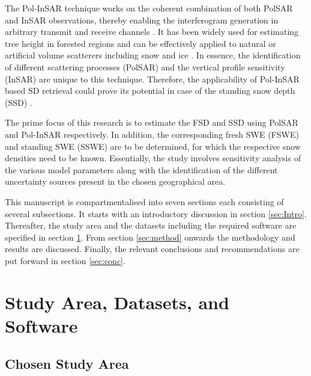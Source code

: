 \documentclass[review]{elsarticle}
\begin{document}
The Pol-InSAR technique works on the coherent combination of both PolSAR and InSAR observations, thereby enabling the interferogram generation in arbitrary transmit and receive channels \citep{Cloude1998, Cloude2005, Cloude2010}. It has been widely used for estimating tree height in forested regions and can be effectively applied to natural or artificial volume scatterers including snow and ice \citep{Hajnsek2009, Kugler2015, Kumar2017, Papathanassiou2001}. In essence, the identification of different scattering processes (PolSAR) and the vertical profile sensitivity (InSAR) are unique to this technique. Therefore, the applicability of Pol-InSAR based SD retrieval could prove its potential in case of the standing snow depth (SSD) \citep{Negi2009, Thakur2012, Thakur2017}.

The prime focus of this research is to estimate the FSD and SSD using PolSAR and Pol-InSAR respectively. In addition, the corresponding fresh SWE (FSWE) and standing SWE (SSWE) are to be determined, for which the respective snow densities need to be known. Essentially, the study involves sensitivity analysis of the various model parameters along with the identification of the different uncertainty sources present in the chosen geographical area. 

This manuscript is compartmentalised into seven sections each consisting of several subsections. It starts with an introductory discussion in section \ref{sec:Intro}. Thereafter, the study area and the datasets including the required  software are specified in section \ref{sec:study}. From section \ref{sec:method} onwards the methodology and results are discussed. Finally, the relevant conclusions and recommendations are put forward in section \ref{sec:conc}.

\section{Study Area, Datasets, and Software}
\label{sec:study}

\subsection{Chosen Study Area}
\end{document}

